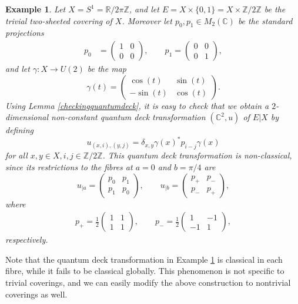 \documentclass[a4paper]{amsart}
\numberwithin{equation}{section}
\theoremstyle{change}
\newtheorem{example}[theorem]{Example}
\begin{document}
\begin{example} \label{extrivialquantumdeck}
Let $ X = S^1 = \mathbb{R}/2 \pi \mathbb{Z} $, and let $ E = X \times \{0,1\} = X \times \mathbb{Z}/2 \mathbb{Z} $ be the trivial two-sheeted covering of $ X $. Moreover let $ p_0, p_1 \in M_2(\mathbb{C}) $ be the standard projections
\begin{align*}
p_0 &= \begin{pmatrix} 
1 & 0 \\
0 & 0
\end{pmatrix}, 
\qquad 
p_1 = \begin{pmatrix} 
0 & 0 \\
0 & 1
\end{pmatrix}, 
\end{align*}
and let $ \gamma: X \rightarrow U(2) $ be the map
$$
\gamma(t) = 
\begin{pmatrix} 
\cos(t) & \sin(t) \\
-\sin(t) & \cos(t) 
\end{pmatrix}.
$$
Using Lemma \ref{checkingquantumdeck}, it is easy to check that we obtain a $ 2 $-dimensional non-constant quantum deck transformation $ (\mathbb{C}^2, u) $ of $ E|X $ by defining 
$$
u_{(x,i),(y, j)} = \delta_{x,y} \gamma(x)^* p_{i - j} \gamma(x)
$$
for all $ x, y \in X, i,j \in \mathbb{Z}/2 \mathbb{Z} $. This quantum deck transformation is non-classical, since its restrictions to the fibres at $ a = 0 $ and $ b = \pi/4 $ are  
$$
u_{|a} = \begin{pmatrix} 
p_0 & p_1 \\
p_1 & p_0 
\end{pmatrix}, 
\qquad  
u_{|b} = \begin{pmatrix} 
p_+ & p_- \\
p_- & p_+ 
\end{pmatrix},
$$
where 
\begin{align*}
p_+ = \frac{1}{2} \begin{pmatrix} 
1 & 1 \\
1 & 1
\end{pmatrix}, 
\qquad 
p_- = 
\frac{1}{2} \begin{pmatrix} 
1 & -1 \\
-1 & 1
\end{pmatrix},
\end{align*} 
respectively. 
\end{example}

Note that the quantum deck transformation in Example \ref{extrivialquantumdeck} is classical in each fibre, while it fails to be classical globally. This phenomenon is not specific to trivial coverings, and we can easily modify the above construction to nontrivial coverings as well. 
\end{document}
